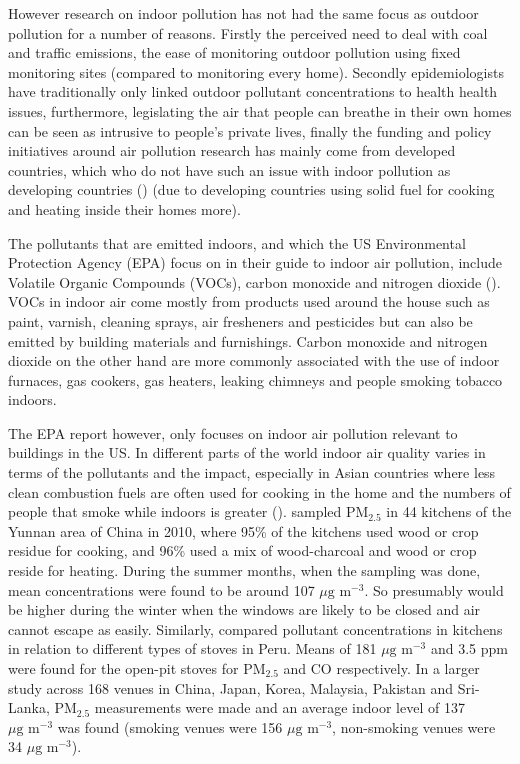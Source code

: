 However research on indoor pollution has not had the same focus as outdoor pollution for a number of reasons. Firstly the perceived need to deal with coal and traffic emissions, the ease of monitoring outdoor pollution using fixed monitoring sites (compared to monitoring every home). Secondly epidemiologists have traditionally only linked outdoor pollutant concentrations to health health issues, furthermore, legislating the air that people can breathe in their own homes can be seen as intrusive to people's private lives, finally  the funding and policy initiatives around air pollution research has mainly come from developed countries, which who do not have such an issue with indoor pollution as developing countries (\cite{WorldHealthOrganization2010}) (due to developing countries using solid fuel for cooking and heating inside their homes more).

The pollutants that are emitted indoors, and which the US Environmental Protection Agency (EPA) focus on in their guide to indoor air pollution, include Volatile Organic Compounds (VOCs), carbon monoxide and nitrogen dioxide (\cite{UnitedStatesEnvironmentalProtectionAgency2008}). VOCs in indoor air come mostly from products used around the house such as paint, varnish, cleaning sprays, air fresheners and pesticides but can also be emitted by building materials and furnishings. Carbon monoxide and nitrogen dioxide on the other hand are more commonly associated with the use of indoor furnaces, gas cookers, gas heaters, leaking chimneys and people smoking tobacco indoors.

The EPA report however, only focuses on indoor air pollution relevant to buildings in the US. In different parts of the world indoor air quality varies in terms of the pollutants and the impact, especially in Asian countries where less clean combustion fuels are often used for cooking in the home and the numbers of people that smoke while indoors is greater (\cite{Lee2010}). 
\cite{Baumgartner2011} sampled PM$_{2.5}$ in 44 kitchens of the Yunnan area of China in 2010, where 95\% of the kitchens used wood or crop residue for cooking, and 96\% used a mix of wood-charcoal and wood or crop reside for heating. During the summer months, when the sampling was done, mean concentrations were found to be around 107 $\mu \text{g m}^{-3}$. So presumably would be higher during the winter when the windows are likely to be closed and air cannot escape as easily. Similarly, \cite{Li2011} compared pollutant concentrations in kitchens in relation to different types of stoves in Peru. Means of 181 $\mu \text{g m}^{-3}$ and 3.5 ppm were found for the open-pit stoves for PM$_{2.5}$ and CO respectively. In a larger study across 168 venues in China, Japan, Korea, Malaysia, Pakistan and Sri-Lanka, PM$_{2.5}$ measurements were made and an average indoor level of 137 $\mu \text{g m}^{-3}$ was found (smoking venues were 156 $\mu \text{g m}^{-3}$, non-smoking venues were 34 $\mu \text{g m}^{-3}$).

